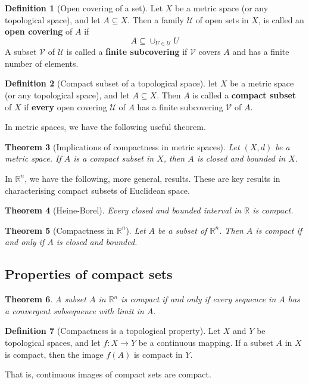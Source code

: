 \documentclass[10pt, oneside, reqno]{amsart}
\theoremstyle{plain}%
\newtheorem{thm}{Theorem}[section]
\theoremstyle{definition}
\newtheorem{defn}[thm]{Definition}
\theoremstyle{remark}
\newcommand{\R}{\mathbb{R}}
\newcommand{\met}{(X,d)}
\begin{document}
\begin{defn}[Open covering of a set]
	Let $X$ be a metric space (or any topological space), and let $A \subseteq X$.  Then a family $\mathcal{U}$ of open sets in $X$, is called an \textbf{open covering} of $A$ if \[
		A \subseteq \cup_{U \in \mathcal{U}} U
	\]
A subset $\mathcal{V}$ of $\mathcal{U}$ is called a \textbf{finite subcovering} if $\mathcal{V}$ covers $A$ and has a finite number of elements.
\end{defn}

\begin{defn}[Compact subset of a topological space]
	let $X$ be a metric space (or any topological space), and let $A \subseteq X$.  Then $A$ is called a \textbf{compact subset} of $X$ if \textbf{every} open covering $\mathcal{U}$ of $A$ has a finite subcovering $\mathcal{V}$ of $A$. 
\end{defn}

In metric spaces, we have the following useful theorem.

\begin{thm}[Implications of compactness in metric spaces]
	Let $\met$ be a metric space.  If $A$ is a compact subset in $X$, then $A$ is closed and bounded in $X$.  
\end{thm}

In $\R^n$, we have the following, more general, results.  These are key results in characterising compact subsets of Euclidean space.

\begin{thm}[Heine-Borel]
	Every closed and bounded interval in $\R$ is compact.
\end{thm}

\begin{thm}[Compactness in $\R^n$]
	Let $A$ be a subset of $\R^n$.  Then $A$ is compact if and only if $A$ is closed and bounded.
\end{thm}

\subsection{Properties of compact sets} %
\label{sub:properties_of_compact_sets}
\begin{thm}
	A subset $A$ in $\R^n$ is compact if and only if every sequence in $A$ has a convergent subsequence with limit in $A$.
\end{thm}

\begin{defn}[Compactness is a topological property]
	Let $X$ and $Y$ be topological spaces, and let $f : X \rightarrow Y$ be a continuous mapping.  If a subset $A$ in $X$ is compact, then the image $f(A)$ is compact in $Y$.
	
	That is, continuous images of compact sets are compact.
\end{defn}
\end{document}
